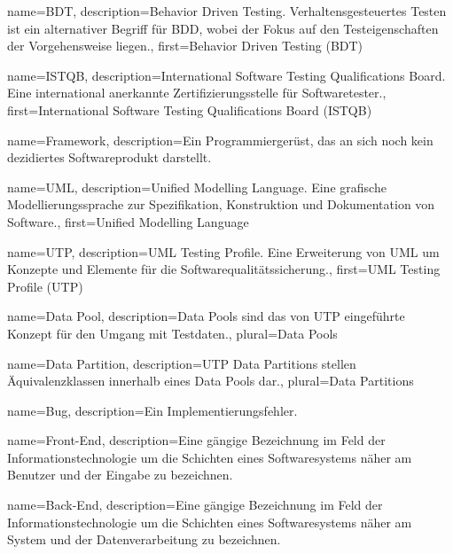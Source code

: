  {
	name={BDT},
	description={Behavior Driven Testing. Verhaltensgesteuertes Testen ist ein alternativer Begriff für BDD, wobei der Fokus auf den Testeigenschaften der Vorgehensweise liegen.},
	first={Behavior Driven Testing (BDT)}
}

 {
	name={ISTQB},
	description={International Software Testing Qualifications Board. Eine international anerkannte Zertifizierungsstelle für Softwaretester.},
	first={International Software Testing Qualifications Board (ISTQB)}
}

 {
	name={Framework},
	description={Ein Programmiergerüst, das an sich noch kein dezidiertes Softwareprodukt darstellt.}
}

 {
	name={UML},
	description={Unified Modelling Language. Eine grafische Modellierungssprache zur Spezifikation, Konstruktion und Dokumentation von Software.},
	first={Unified Modelling Language}
}

 {
	name={UTP},
	description={UML Testing Profile. Eine Erweiterung von UML um Konzepte und Elemente für die Softwarequalitätssicherung.},
	first={UML Testing Profile (UTP)}
}

 {
	name={Data Pool},
	description={Data Pools sind das von UTP eingeführte Konzept für den Umgang mit Testdaten.},
	plural={Data Pools}
}

 {
	name={Data Partition},
	description={UTP Data Partitions stellen Äquivalenzklassen innerhalb eines Data Pools dar.},
	plural={Data Partitions}
}

 {
	name={Bug},
	description={Ein Implementierungsfehler.}
}

 {
	name={Front-End},
	description={Eine gängige Bezeichnung im Feld der Informationstechnologie um die Schichten eines Softwaresystems näher am Benutzer und der Eingabe zu bezeichnen.}
}

 {
	name={Back-End},
	description={Eine gängige Bezeichnung im Feld der Informationstechnologie um die Schichten eines Softwaresystems näher am System und der Datenverarbeitung zu bezeichnen.}
}

